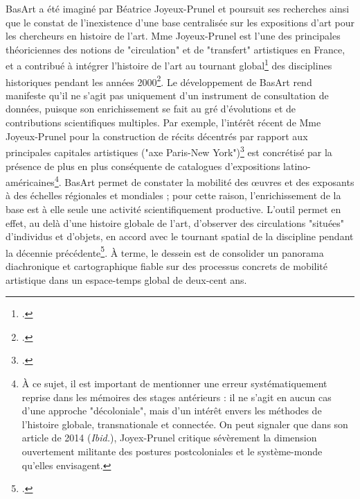 \documentclass[a4paper,12pt,twoside]{book}
\begin{document}
BasArt a été imaginé par Béatrice Joyeux-Prunel et poursuit ses recherches ainsi que le constat de l'inexistence d'une base centralisée sur les expositions d'art pour les chercheurs en histoire de l'art. Mme Joyeux-Prunel est l'une des principales théoriciennes des notions de "circulation" et de "transfert" artistiques en France, et a contribué à intégrer l'histoire de l'art au tournant global\footcite{saunierCirculationsConnexionsEspaces2005, baylyAHRConversationTransnational2006, elkinsArtHistoryGlobal2007} des disciplines historiques pendant les années 2000\footcite{joyeux-prunelCeQueApproche2014, joyeux-prunelReintroducingCirculationsHistoriography2015, joyeux-prunelTransfertsCulturels2003}. Le développement de BasArt rend manifeste qu'il ne s'agit pas uniquement d'un instrument de consultation de données, puisque son enrichissement se fait au gré d'évolutions et de contributions scientifiques multiples. Par exemple, l'intérêt récent de Mme Joyeux-Prunel pour la construction de récits décentrés par rapport aux principales capitales artistiques ("axe Paris-New York")\footcite{joyeux-prunelProvincializingParisCenterPeriphery2015}  est concrétisé par la présence de plus en plus conséquente de catalogues d'expositions latino-américaines\footnote{À ce sujet, il est important de mentionner une erreur systématiquement reprise dans les mémoires des stages antérieurs : il ne s'agit en aucun cas d'une approche "décoloniale", mais d'un intérêt envers les méthodes de l'histoire globale, transnationale et connectée. On peut signaler que dans son article de 2014 (\textit{Ibid.}), Joyex-Prunel critique sévèrement la dimension ouvertement militante des postures postcoloniales et le système-monde qu'elles envisagent.}. BasArt permet de constater la mobilité des œuvres et des exposants à des échelles régionales et mondiales ; pour cette raison, l'enrichissement de la base est à elle seule une activité scientifiquement productive. L'outil permet en effet, au delà d'une histoire globale de l'art, d'observer des circulations "situées" d'individus et d'objets, en accord avec le tournant spatial de la discipline pendant la décennie précédente\footcite{dossinSpatialDigitalArt2015, dacostakaufmannGeographyArt2004, besseApprochesSpatialesDans2010}. À terme, le dessein est  de consolider un panorama diachronique et cartographique fiable sur des processus concrets de mobilité artistique dans un espace-temps global de deux-cent ans. 
\end{document}
